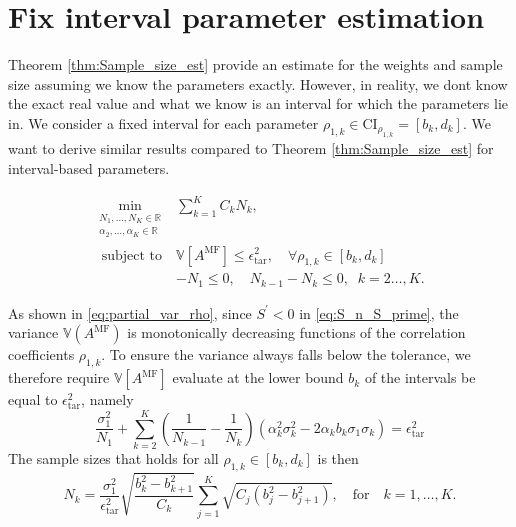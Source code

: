 \section{Fix interval parameter estimation}\label{sec:Fix_interval_parameter_est}
Theorem \eqref{thm:Sample_size_est} provide an estimate for the weights and sample size assuming we know the parameters exactly. However, in reality, we dont know the exact real value and what we know is an interval for which the parameters lie in. We consider a fixed interval for each parameter $\rho_{1,k}\in \text{CI}_{\rho_{1,k}}=[b_k,d_k]$. We want to derive similar results compared to Theorem \eqref{thm:Sample_size_est} for interval-based parameters.

%
\begin{equation}\label{eq:Optimization_pb_sample_size2}
    \begin{array}{ll}
    \min \limits_{\begin{array}{c}\scriptstyle N_1,\ldots, N_K\in \mathbb{R} \\[-4pt]
\scriptstyle \alpha_2,\ldots,\alpha_K\in \mathbb{R}
\end{array}} &\displaystyle\sum\limits_{k=1}^K C_kN_k,\\
       \;\,\text{subject to} &\mathbb{V}\left[A^{\text{MF}}\right]\le \epsilon_{\text{tar}}^2, \quad \forall \rho_{1,k} \in [b_k,d_k]\\[2pt]
       &\displaystyle -N_1\le 0,\quad \displaystyle N_{k-1}-N_k\le 0, \;\; k=2\ldots,K.
    \end{array}
\end{equation}
%

As shown in \eqref{eq:partial_var_rho}, since $S^\prime<0$ in \eqref{eq:S_n_S_prime}, the variance $\mathbb{V}(A^{\text{MF}})$ is monotonically decreasing functions of the correlation coefficients $\rho_{1,k}$. To ensure the variance always falls below the tolerance, we therefore require $\mathbb{V}\left[A^{\text{MF}}\right]$ evaluate at the lower bound $b_k$ of the intervals be equal to $\epsilon_{\text{tar}}^2$, namely
%
\[
\frac{\sigma_1^2}{N_1} + \sum_{k=2}^K \left(\frac{1}{N_{k-1}} - \frac{1}{N_k}\right)\left(\alpha_k^2\sigma_k^2 - 2\alpha_kb_{k}\sigma_1\sigma_k\right) = \epsilon_{\text{tar}}^2
\]
%
The sample sizes that holds for all $\rho_{1,k}\in [b_k,d_k]$ is then
%
\[
N_k = \frac{\sigma_1^2}{\epsilon_{\text{tar}}^2}\sqrt{\frac{b_k^2-b_{k+1}^2}{C_k}}\sum_{j=1}^K\sqrt{C_j\left(b_j^2-b_{j+1}^2\right)},\quad \text{for}\quad  k=1,\ldots,K.
\]



